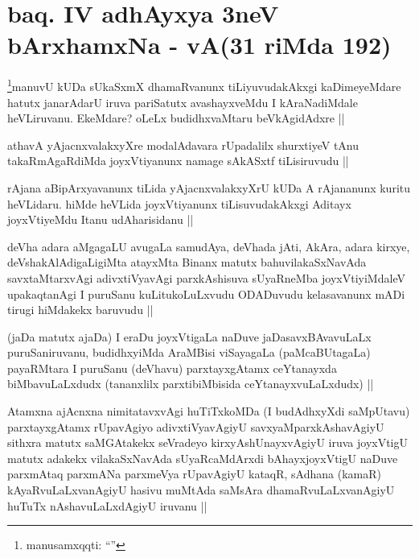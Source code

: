 \section*{baq. {\rm IV} adhAyxya 3neV bArxhamxNa - vA(31 riMda 192)}


\begin{artha}
\footnote[1]{manusamxqqti: ``\stext''}manuvU kUDa sUkaSxmX dhamaRvanunx tiLiyuvudakAkxgi kaDimeyeMdare hatutx janarAdarU iruva pariSatutx avashayxveMdu I kAraNadiMdale heVLiruvanu. EkeMdare? oLeLx budidhxvaMtaru beVkAgidAdxre ||
\end{artha}

\begin{artha}
athavA yAjacnxvalakxyXre modalAdavara rUpadalilx shurxtiyeV tAnu takaRmAgaRdiMda joyxVtiyanunx namage sAkASxtf tiLisiruvudu ||
\end{artha}

\begin{artha}
rAjana aBipArxyavanunx tiLida yAjacnxvalakxyXrU kUDa A rAjananunx kuritu heVLidaru. hiMde heVLida joyxVtiyanunx tiLisuvudakAkxgi Aditayx joyxVtiyeMdu Itanu udAharisidanu ||
\end{artha}

\begin{artha}
deVha adara aMgagaLU avugaLa samudAya, deVhada jAti, AkAra, adara kirxye, deVshakAlAdigaLigiMta atayxMta Binanx matutx bahuvilakaSxNavAda savxtaMtarxvAgi adivxtiVyavAgi parxkAshisuva sUyaRneMba joyxVtiyiMdaleV upakaqtanAgi I puruSanu kuLitukoLuLxvudu ODADuvudu kelasavanunx mADi tirugi hiMdakekx baruvudu ||
\end{artha}

\begin{artha}
(jaDa matutx ajaDa) I eraDu joyxVtigaLa naDuve jaDasavxBAvavuLaLx puruSaniruvanu, budidhxyiMda AraMBisi viSayagaLa (paMcaBUtagaLa) payaRMtara I puruSanu (deVhavu) parxtayxgAtamx ceYtanayxda biMbavuLaLxdudx (tananxlilx parxtibiMbisida ceYtanayxvuLaLxdudx) ||
\end{artha}

\begin{artha}
Atamxna ajAcnxna nimitatavxvAgi huTiTxkoMDa (I budAdhxyXdi saMpUtavu) parxtayxgAtamx rUpavAgiyo adivxtiVyavAgiyU savxyaMparxkAshavAgiyU sithxra matutx saMGAtakekx seVradeyo kirxyAshUnayxvAgiyU iruva joyxVtigU matutx adakekx vilakaSxNavAda sUyaRcaMdArxdi bAhayxjoyxVtigU naDuve parxmAtaq parxmANa parxmeVya rUpavAgiyU kataqR, sAdhana (kamaR) kAyaRvuLaLxvanAgiyU hasivu muMtAda saMsAra dhamaRvuLaLxvanAgiyU huTuTx nAshavuLaLxdAgiyU iruvanu ||
\end{artha}

